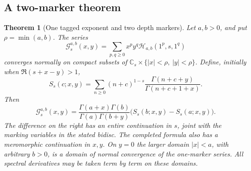 \documentclass[11pt,a4paper]{article}
\numberwithin{equation}{section}
\newtheorem{theorem}{Theorem}[section]
\theoremstyle{definition}
\theoremstyle{remark}
\newcommand{\Hrel}{\mathcal H}
\begin{document}
\subsection{A two-marker theorem}

\begin{theorem}[One tagged exponent and two depth markers]\label{ord:two}
Let $a,b>0$, and put $\rho=\min(a,b)$.  The series
\begin{equation}\label{ord:Gdef}
 \mathscr G_s^{a,b}(x,y)
   =\sum_{p,q\ge0}x^py^q\Hrel_{a,b}(1^p,s,1^q)
\end{equation}
converges normally on compact subsets of
$\mathbb C_s\times\{|x|<\rho,\ |y|<\rho\}$.  Define, initially when
$\Re(s+x-y)>1$,
\begin{equation}\label{ord:kernel}
 S_s(c;x,y)=
   \sum_{n\ge0}(n+c)^{1-s}
       \frac{\Gamma(n+c+y)}{\Gamma(n+c+1+x)}.
\end{equation}
Then
\begin{equation}\label{ord:twoformula}
 \boxed{\;
 \mathscr G_s^{a,b}(x,y)
 =\frac{\Gamma(a+x)\Gamma(b)}
        {\Gamma(a)\Gamma(b+y)}
       \bigl(S_s(b;x,y)-S_s(a;x,y)\bigr).
 \;}
\end{equation}
The difference on the right has an entire continuation in $s$, joint
with the marking variables in the stated bidisc.  The completed formula
also has a meromorphic continuation in $x,y$.  On $y=0$ the larger domain
$|x|<a$, with arbitrary $b>0$, is a domain of normal convergence of the
one-marker series.  All spectral derivatives may be taken term by term
on these domains.
\end{theorem}
\end{document}
